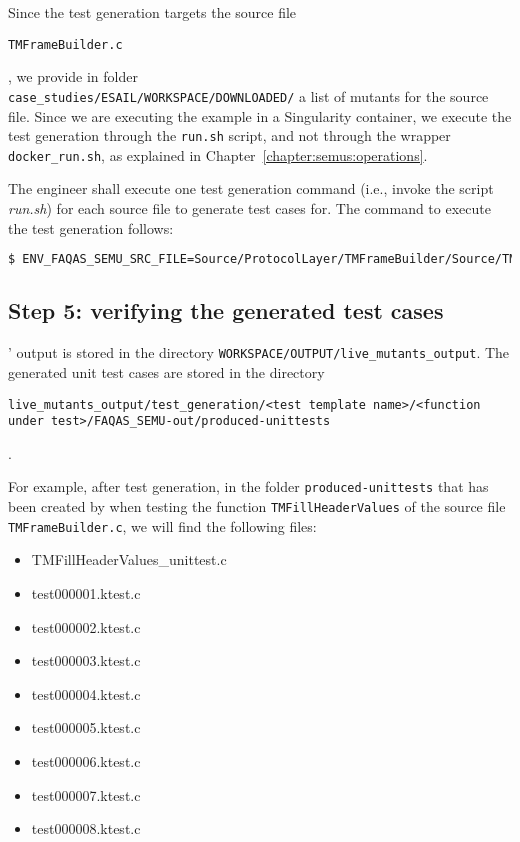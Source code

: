 Since the test generation targets the source file \begin{small}\texttt{TMFrameBuilder.c}\end{small}, we provide in folder\\
\texttt{case\_studies/ESAIL/WORKSPACE/DOWNLOADED/} a list of mutants for the source file. 
Since we are executing the example in a Singularity container, we execute the test generation through the \texttt{run.sh} script, and not through the wrapper \texttt{docker\_run.sh}, as explained in Chapter~\ref{chapter:semus:operations}.

The engineer shall execute one test generation command (i.e., invoke the script \emph{run.sh}) for each source file to generate test cases for. The command to execute the test generation follows:

\begin{lstlisting}[language=bash]
 $ ENV_FAQAS_SEMU_SRC_FILE=Source/ProtocolLayer/TMFrameBuilder/Source/TMFrameBuilder.c ./run.sh mutation ../WORKSPACE/DOWNLOADED/live-Source.ProtocolLayer.TMFrameBuilder.Source.TMFrameBuilder  ../WORKSPACE/OUTPUT/live_mutants_output
\end{lstlisting}

\subsection{Step 5: verifying the generated test cases}

\SEMUS' output is stored in the directory \texttt{WORKSPACE/OUTPUT/live\_mutants\_output}. The generated unit test cases are stored in the directory \begin{small}\texttt{live\_mutants\_output/test\_generation/<test template name>/<function under test>/FAQAS\_SEMU-out/produced-unittests}\end{small}.

For example, after test generation, in the folder \texttt{produced-unittests} that has been created by \SEMUS when testing the function \texttt{TMFillHeaderValues}  of the source file \texttt{TMFrameBuilder.c}, we will find the following files:

\begin{itemize}
\item TMFillHeaderValues\_unittest.c
\item test000001.ktest.c
\item test000002.ktest.c
\item test000003.ktest.c
\item test000004.ktest.c
\item test000005.ktest.c
\item test000006.ktest.c
\item test000007.ktest.c
\item test000008.ktest.c
\end{itemize}

